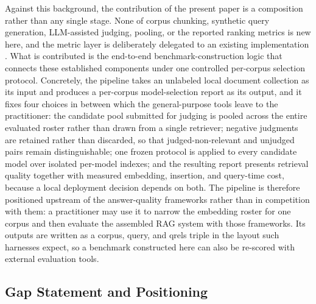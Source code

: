 Against this background, the contribution of the present paper is a composition rather than any single stage. None of corpus chunking, synthetic query generation, LLM-assisted judging, pooling, or the reported ranking metrics is new here, and the metric layer is deliberately delegated to an existing implementation \citep{reimers2019sentencebert}. What is contributed is the end-to-end benchmark-construction logic that connects these established components under one controlled per-corpus selection protocol. Concretely, the pipeline takes an unlabeled local document collection as its input and produces a per-corpus model-selection report as its output, and it fixes four choices in between which the general-purpose tools leave to the practitioner: the candidate pool submitted for judging is pooled across the entire evaluated roster rather than drawn from a single retriever; negative judgments are retained rather than discarded, so that judged-non-relevant and unjudged pairs remain distinguishable; one frozen protocol is applied to every candidate model over isolated per-model indexes; and the resulting report presents retrieval quality together with measured embedding, insertion, and query-time cost, because a local deployment decision depends on both. The pipeline is therefore positioned upstream of the answer-quality frameworks rather than in competition with them: a practitioner may use it to narrow the embedding roster for one corpus and then evaluate the assembled RAG system with those frameworks. Its outputs are written as a corpus, query, and qrels triple in the layout such harnesses expect, so a benchmark constructed here can also be re-scored with external evaluation tools.

\subsection{Gap Statement and Positioning}\label{rw-gap}

